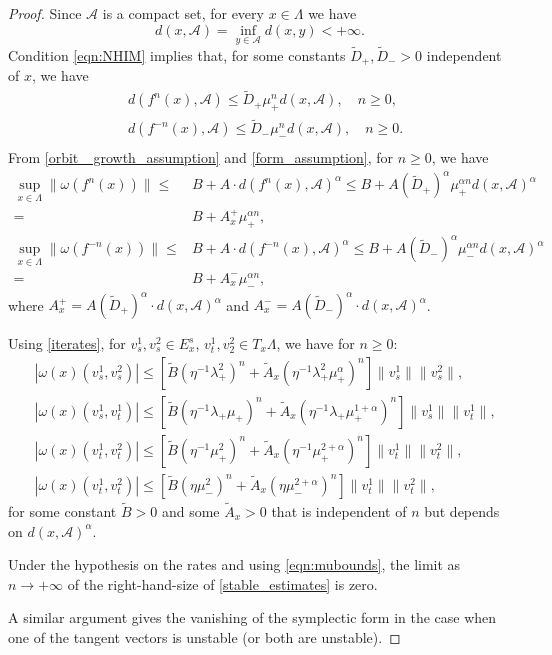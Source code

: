 \documentclass[11pt]{amsart}
\theoremstyle{definition}
\theoremstyle{remark}
\numberwithin{equation}{section}
\newcommand{\A}{\mathcal{A}}
\begin{document}
\begin{proof}
Since $\A$ is a compact set, for every $x\in\Lambda$ we have
\[
d(x,\A)=\inf_{y\in \A}d(x,y)<+\infty .
\]
Condition \eqref{eqn:NHIM} implies that, for some constants $\tilde{D}_+, \tilde{D}_->0$ independent of
$x$, we have
\begin{equation} \label{orbit_ growth_assumption}
    \begin{split}
       & d(f^{n} (x), \A) \le \tilde{D}_+\mu_+^n d(x, \A), \quad n \ge 0, \\
       & d(f^{-n} (x), \A) \le \tilde{D}_-\mu_-^n d(x,\A), \quad n \ge 0 . \\
      \end{split}
    \end{equation}
From \eqref{orbit_ growth_assumption} and \eqref{form_assumption}, for $n\ge 0$, we have
\[
\begin{split}
\sup_{x \in \Lambda} \| \omega (f^n(x)) \|  \le& B+A\cdot d(f^n(x),\A)^\alpha\le B+A (\tilde{D}_+) ^\alpha \mu_+^{\alpha n}d(x,\A)^\alpha\\
  =&B+A^+_x  \mu_+^{\alpha n},\\
\sup_{x \in \Lambda} \| \omega (f^{-n}(x)) \|  \le& B+A\cdot d(f^{-n}(x),\A)^\alpha\le B+A (\tilde{D}_-) ^\alpha \mu_-^{\alpha n}d(x,\A)^\alpha\\
   =&B+A^-_x  \mu_-^{\alpha n},
\end{split}\]
where $A^+_x=A(\tilde{D}_+ )^\alpha  \cdot d(x,\A)^\alpha$ and $A^-_x=A(\tilde{D}_- )^\alpha  \cdot d(x,\A)^\alpha$.

    Using \eqref{iterates}, for $v^1_s, v^2_s  \in E^s_x$, $v^1_t,v^2_2\in T_x\Lambda$,
    we have for $n \ge 0$:
    \begin{equation}\label{stable_estimates}
    \begin{split}
      & | \omega(x)(v^1_s, v^2_s)| \le \left [\tilde B (\eta^{-1}\lambda_+^2)^n +\tilde A _x(\eta^{-1} \lambda_+^2 \mu_+ ^ \alpha)^ n \right]\|v^1_s\| \|v^2_s\| ,\\
      & | \omega(x)(v^1_s, v^1_t)| \le \left[\tilde B (\eta^{-1}\lambda_+ \mu_+)^n +  \tilde A _x(\eta^{-1}\lambda_+ \mu_+^{1+\alpha})^n \right] \|v^1_s\| \|v^1_t\| , \\
      & | \omega(x)(v^1_t, v^2_t)| \le \left[\tilde  B (\eta^{-1}\mu_+^2)^n +  \tilde A _x(\eta^{-1} \mu_+^{2+\alpha})^n \right] \|v^1_t\| \|v^2_t\| ,\\
      & | \omega(x)(v^1_t, v^2_t)| \le \left[\tilde B (\eta \mu_-^2)^n +  \tilde A _x(\eta  \mu_-^{2+\alpha})^n \right] \|v^1_t\| \|v^2_t\|,
    \end{split}
    \end{equation}
    for some constant  $\tilde B>0$ and   some   $\tilde A _x>0$  that  is independent of $n$ but depends on  $d(x,\A)^\alpha$.

    Under the hypothesis on the rates and using  \eqref{eqn:mubounds}, the limit
   as $n \rightarrow +\infty$
    of the right-hand-size of
    \eqref{stable_estimates}  is zero.


   A similar argument gives the vanishing of the symplectic form in the case when one of the tangent vectors is unstable (or both are unstable).
\end{proof}
\end{document}
